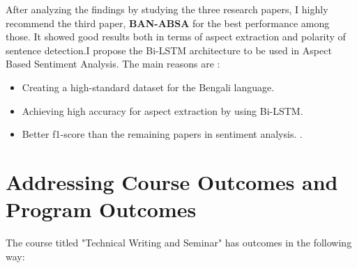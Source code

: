 \documentclass[a4paper,12pt]{article}
\begin{document}
\vspace{0.7cm}


After analyzing the findings by studying the three research papers, I highly recommend the third paper, \textbf{BAN-ABSA}\cite{third} for the best performance among those. It showed good results both in terms of aspect extraction and polarity of sentence detection.I propose the Bi-LSTM architecture to be used in Aspect Based Sentiment Analysis. The main reasons are :
\begin{itemize}
        \item Creating a high-standard dataset for the Bengali language.
        \item Achieving high accuracy for aspect extraction by using Bi-LSTM.
        \item Better f1-score than the remaining papers in sentiment analysis.    . 
\end{itemize}

\section{Addressing Course Outcomes and Program Outcomes}

The course titled "Technical Writing and Seminar" has outcomes in the following way:
\end{document}
